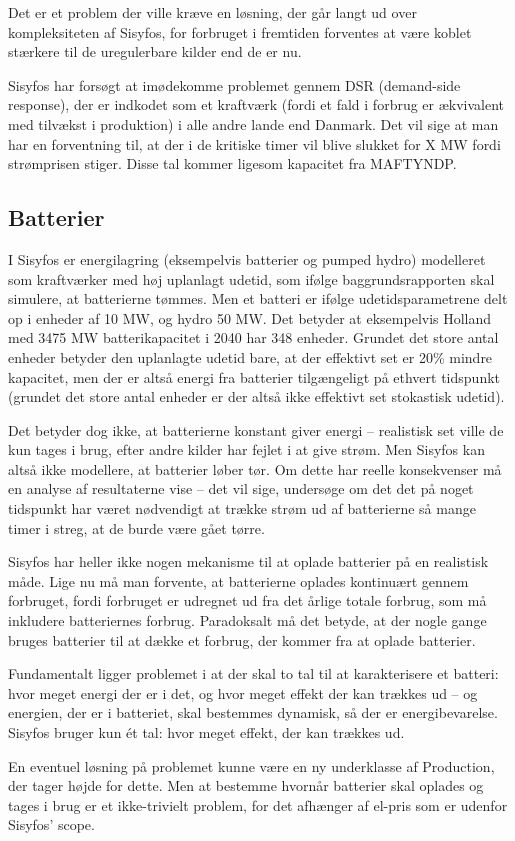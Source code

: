 \documentclass{article}
\begin{document}
Det er et problem der ville kræve en løsning, der går langt ud over kompleksiteten af Sisyfos, for forbruget i fremtiden forventes at være koblet stærkere til de uregulerbare kilder end de er nu.

Sisyfos har forsøgt at imødekomme problemet gennem DSR (demand-side response), der er indkodet som et kraftværk (fordi et fald i forbrug er ækvivalent med tilvækst i produktion) i alle andre lande end Danmark. Det vil sige at man har en forventning til, at der i de kritiske timer vil blive slukket for X MW fordi strømprisen stiger. Disse tal kommer ligesom kapacitet fra MAFTYNDP.
\subsection{Batterier}
I Sisyfos er energilagring (eksempelvis batterier og pumped hydro) modelleret som kraftværker med høj uplanlagt udetid, som ifølge baggrundsrapporten skal simulere, at batterierne tømmes. Men et batteri er ifølge udetidsparametrene delt op i enheder af 10 MW, og hydro 50 MW. Det betyder at eksempelvis Holland med 3475 MW batterikapacitet i 2040 har 348 enheder. Grundet det store antal enheder betyder den uplanlagte udetid bare, at der effektivt set er 20\% mindre kapacitet, men der er altså energi fra batterier tilgængeligt på ethvert tidspunkt (grundet det store antal enheder er der altså ikke effektivt set stokastisk udetid). 

Det betyder dog ikke, at batterierne konstant giver energi -- realistisk set ville de kun tages i brug, efter andre kilder har fejlet i at give strøm. Men Sisyfos kan altså ikke modellere, at batterier løber tør. Om dette har reelle konsekvenser må en analyse af resultaterne vise -- det vil sige, undersøge om det det på noget tidspunkt har været nødvendigt at trække strøm ud af batterierne så mange timer i streg, at de burde være gået tørre.

Sisyfos har heller ikke nogen mekanisme til at oplade batterier på en realistisk måde. Lige nu må man forvente, at batterierne oplades kontinuært gennem forbruget, fordi forbruget er udregnet ud fra det årlige totale forbrug, som må inkludere batteriernes forbrug. Paradoksalt må det betyde, at der nogle gange bruges batterier til at dække et forbrug, der kommer fra at oplade batterier.

Fundamentalt ligger problemet i at der skal to tal til at karakterisere et batteri: hvor meget energi der er i det, og hvor meget effekt der kan trækkes ud -- og energien, der er i batteriet, skal bestemmes dynamisk, så der er energibevarelse. Sisyfos bruger kun ét tal: hvor meget effekt, der kan trækkes ud. 

En eventuel løsning på problemet kunne være en ny underklasse af Production, der tager højde for dette. Men at bestemme hvornår batterier skal oplades og tages i brug er et ikke-trivielt problem, for det afhænger af el-pris som er udenfor Sisyfos' scope.
\end{document}
